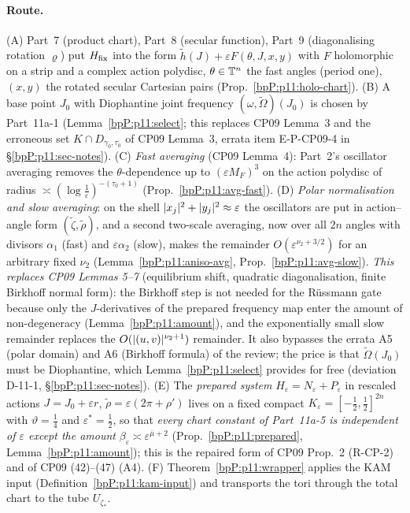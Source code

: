 \paragraph{Route.} (A) Part~7 (product chart), Part~8 (secular function), Part~9 (diagonalising rotation $\varrho$) put $H_{\rm fix}$ into the form $\tilde h(J)+\varepsilon F(\theta,J,x,y)$ with $F$ holomorphic on a strip and a complex action polydisc, $\theta\in\mathbb{T}^n$ the fast angles (period one), $(x,y)$ the rotated secular Cartesian pairs (Prop.~\ref{bpP:p11:holo-chart}). (B) A base point $J_0$ with Diophantine joint frequency $(\omega,\tilde\Omega)(J_0)$ is chosen by Part~11a-1 (Lemma~\ref{bpP:p11:select}; this replaces CP09 Lemma~3 and the erroneous set $K\cap D_{\gamma_0,\tau_0}$ of CP09 Lemma~3, errata item E-P-CP09-4 in \S\ref{bpP:p11:sec-notes}). (C) \emph{Fast averaging} (CP09 Lemma~4): Part~2's oscillator averaging removes the $\theta$-dependence up to $(\varepsilon M_F)^3$ on the action polydisc of radius $\asymp(\log\frac1\varepsilon)^{-(\tau_0+1)}$ (Prop.~\ref{bpP:p11:avg-fast}). (D) \emph{Polar normalisation and slow averaging}: on the shell $\lvert x_j\rvert^2+\lvert y_j\rvert^2\approx\varepsilon$ the oscillators are put in action--angle form $(\tilde\zeta,\tilde\rho)$, and a second two-scale averaging, now over all $2n$ angles with divisors $\alpha_1$ (fast) and $\varepsilon\alpha_2$ (slow), makes the remainder $O(\varepsilon^{\nu_2+3/2})$ for an arbitrary fixed $\nu_2$ (Lemma~\ref{bpP:p11:aniso-avg}, Prop.~\ref{bpP:p11:avg-slow}). \emph{This replaces CP09 Lemmas 5--7} (equilibrium shift, quadratic diagonalisation, finite Birkhoff normal form): the Birkhoff step is not needed for the Rüssmann gate because only the $J$-derivatives of the prepared frequency map enter the amount of non-degeneracy (Lemma~\ref{bpP:p11:amount}), and the exponentially small slow remainder replaces the $O(\lvert (u,v)\rvert^{\nu_2+1})$ remainder. It also bypasses the errata A5 (polar domain) and A6 (Birkhoff formula) of the review; the price is that $\tilde\Omega(J_0)$ must be Diophantine, which Lemma~\ref{bpP:p11:select} provides for free (deviation D-11-1, \S\ref{bpP:p11:sec-notes}). (E) The \emph{prepared system} $\hat H_\varepsilon=N_\varepsilon+P_\varepsilon$ in rescaled actions $J=J_0+\varepsilon r$, $\tilde\rho=\varepsilon(2\pi+\rho')$ lives on a fixed compact $K_\varepsilon=[-\frac12,\frac12]^{2n}$ with $\vartheta=\frac14$ and $\varepsilon^*=\frac12$, so that \emph{every chart constant of Part~11a-5 is independent of $\varepsilon$ except the amount} $\beta_\varepsilon\asymp\varepsilon^{\bar\mu+2}$ (Prop.~\ref{bpP:p11:prepared}, Lemma~\ref{bpP:p11:amount}); this is the repaired form of CP09 Prop.~2 (R-CP-2) and of CP09 (42)--(47) (A4). (F) Theorem~\ref{bpP:p11:wrapper} applies the KAM input (Definition~\ref{bpP:p11:kam-input}) and transports the tori through the total chart to the tube $U_{\zeta_*}$.

